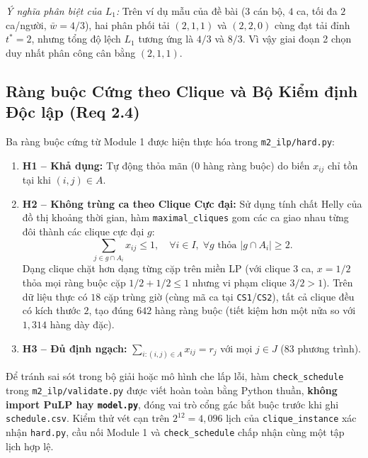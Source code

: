 \textit{Ý nghĩa phân biệt của $L_1$:} Trên ví dụ mẫu của đề bài ($3$ cán bộ, $4$ ca, tối đa $2$ ca/người, $\bar{w} = 4/3$), hai phân phối tải $(2, 1, 1)$ và $(2, 2, 0)$ cùng đạt tải đỉnh $t^* = 2$, nhưng tổng độ lệch $L_1$ tương ứng là $4/3$ và $8/3$. Vì vậy giai đoạn 2 chọn duy nhất phân công cân bằng $(2, 1, 1)$.

\subsection{Ràng buộc Cứng theo Clique và Bộ Kiểm định Độc lập (Req 2.4)}
Ba ràng buộc cứng từ Module 1 được hiện thực hóa trong \texttt{m2\_ilp/hard.py}:
\begin{enumerate}
    \item \textbf{H1 -- Khả dụng:} Tự động thỏa mãn ($0$ hàng ràng buộc) do biến $x_{ij}$ chỉ tồn tại khi $(i, j) \in A$.
    \item \textbf{H2 -- Không trùng ca theo Clique Cực đại:} Sử dụng tính chất Helly của đồ thị khoảng thời gian, hàm \texttt{maximal\_cliques} gom các ca giao nhau từng đôi thành các clique cực đại $g$:
    \begin{equation}
        \sum_{j \in g \cap A_i} x_{ij} \le 1, \quad \forall i \in I, \; \forall g \text{ thỏa } |g \cap A_i| \ge 2.
    \end{equation}
    Dạng clique chặt hơn dạng từng cặp trên miền LP (với clique $3$ ca, $x = 1/2$ thỏa mọi ràng buộc cặp $1/2+1/2 \le 1$ nhưng vi phạm clique $3/2 > 1$). Trên dữ liệu thực có $18$ cặp trùng giờ (cùng mã ca tại \texttt{CS1}/\texttt{CS2}), tất cả clique đều có kích thước $2$, tạo đúng $642$ hàng ràng buộc (tiết kiệm hơn một nửa so với $1{,}314$ hàng dày đặc).
    \item \textbf{H3 -- Đủ định ngạch:} $\sum_{i: (i, j) \in A} x_{ij} = r_j$ với mọi $j \in J$ ($83$ phương trình).
\end{enumerate}

Để tránh sai sót trong bộ giải hoặc mô hình che lấp lỗi, hàm \texttt{check\_schedule} trong \texttt{m2\_ilp/validate.py} được viết hoàn toàn bằng Python thuần, \textbf{không import PuLP hay \texttt{model.py}}, đóng vai trò cổng gác bắt buộc trước khi ghi \texttt{schedule.csv}. Kiểm thử vét cạn trên $2^{12} = 4{,}096$ lịch của \texttt{clique\_instance} xác nhận \texttt{hard.py}, cầu nối Module 1 và \texttt{check\_schedule} chấp nhận cùng một tập lịch hợp lệ.

